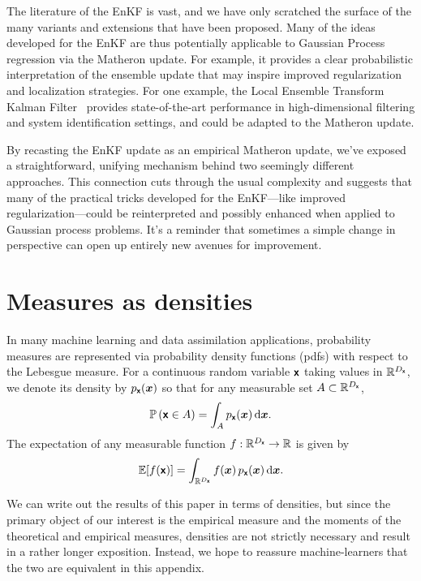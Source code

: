 \documentclass[wcp]{jmlr} %
\begin{document}
The literature of the EnKF is vast, and we have only scratched the surface of the many variants and extensions that have been proposed.
Many of the ideas developed for the EnKF are thus potentially applicable to Gaussian Process regression via the Matheron update.
For example, it provides a clear probabilistic interpretation of the ensemble update that may inspire improved regularization and localization strategies.
For one example, the Local Ensemble Transform Kalman Filter~\citep{Bocquet2020Online} provides state-of-the-art performance in high-dimensional filtering and system identification settings, and could be adapted to the Matheron update.

By recasting the EnKF update as an empirical Matheron update, we’ve exposed a straightforward, unifying mechanism behind two seemingly different approaches. This connection cuts through the usual complexity and suggests that many of the practical tricks developed for the EnKF—like improved regularization—could be reinterpreted and possibly enhanced when applied to Gaussian process problems. It’s a reminder that sometimes a simple change in perspective can open up entirely new avenues for improvement.



\appendix

\section{Measures as densities}\label{sec:densities-please}

In many machine learning and data assimilation applications, probability measures are represented via probability density functions (pdfs) with respect to the Lebesgue measure. For a continuous random variable \(\boldsymbol{\mathsf{x}}\) taking values in \(\mathbb{R}^{D_{\boldsymbol{\mathsf{x}}}}\), we denote its density by \(p_{\boldsymbol{\mathsf{x}}}(\boldsymbol{x})\) so that for any measurable set \(A \subset \mathbb{R}^{D_{\boldsymbol{\mathsf{x}}}}\),
\begin{equation}
    \mathbb{P}\left(\boldsymbol{\mathsf{x}} \in A\right)
    = \int_A p_{\boldsymbol{\mathsf{x}}}(\boldsymbol{x})\,\mathrm{d}\boldsymbol{x}.
\end{equation}
The expectation of any measurable function \(f:\mathbb{R}^{D_{\boldsymbol{\mathsf{x}}}}\to\mathbb{R}\) is given by
\begin{equation}
    \mathbb{E}[f(\boldsymbol{\mathsf{x}})] = \int_{\mathbb{R}^{D_{\boldsymbol{\mathsf{x}}}}} f(\boldsymbol{x})\,p_{\boldsymbol{\mathsf{x}}}(\boldsymbol{x})\,\mathrm{d}\boldsymbol{x}.
\end{equation}

We can write out the results of this paper in terms of densities, but since the primary object of our interest is the empirical measure and the moments of the theoretical and empirical measures, densities are not strictly necessary and result in a rather longer exposition.
Instead, we hope to reassure machine-learners that the two are equivalent in this appendix.
\end{document}
